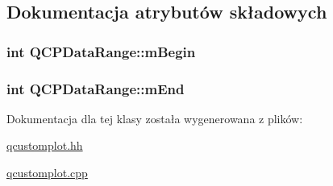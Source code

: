 \subsection{Dokumentacja atrybutów składowych}
\subsubsection[{\texorpdfstring{m\+Begin}{mBegin}}]{\setlength{\rightskip}{0pt plus 5cm}int Q\+C\+P\+Data\+Range\+::m\+Begin\hspace{0.3cm}{\ttfamily [private]}}\hypertarget{class_q_c_p_data_range_a849baf613e8ad866a66aaf45682dde53}{}\label{class_q_c_p_data_range_a849baf613e8ad866a66aaf45682dde53}
\subsubsection[{\texorpdfstring{m\+End}{mEnd}}]{\setlength{\rightskip}{0pt plus 5cm}int Q\+C\+P\+Data\+Range\+::m\+End\hspace{0.3cm}{\ttfamily [private]}}\hypertarget{class_q_c_p_data_range_ac22cfcf2795d5e9f617d788be9fb14a0}{}\label{class_q_c_p_data_range_ac22cfcf2795d5e9f617d788be9fb14a0}


Dokumentacja dla tej klasy została wygenerowana z plików\+:\begin{DoxyCompactItemize}
\item 
\hyperlink{qcustomplot_8hh}{qcustomplot.\+hh}\item 
\hyperlink{qcustomplot_8cpp}{qcustomplot.\+cpp}\end{DoxyCompactItemize}
